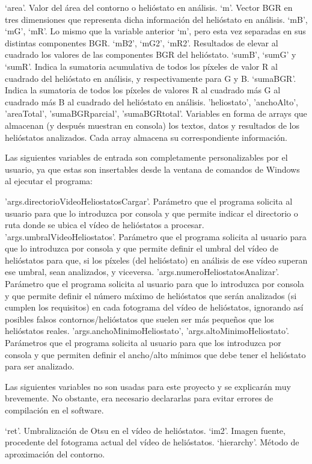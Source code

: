 \documentclass[12pt]{article}
\begin{document}
‘area’. Valor del área del contorno o helióstato en análisis.
‘m’. Vector BGR en tres dimensiones que representa dicha información del helióstato en análisis.
‘mB’, ‘mG’, ‘mR’. Lo mismo que la variable anterior ‘m’, pero esta vez separadas en sus distintas componentes BGR.
‘mB2’, ‘mG2’, ‘mR2’. Resultados de elevar al cuadrado los valores de las componentes BGR del helióstato.
‘sumB’, ‘sumG’ y ‘sumR’. Indica la sumatoria acumulativa de todos los píxeles de valor R al cuadrado del helióstato en análisis, y respectivamente para G y B.
‘sumaBGR’. Indica la sumatoria de todos los píxeles de valores R al cuadrado más G al cuadrado más B al cuadrado del helióstato en análisis.
'heliostato', 'anchoAlto', 'areaTotal', 'sumaBGRparcial', 'sumaBGRtotal'. Variables en forma de arrays que almacenan (y después muestran en consola) los textos, datos y resultados de los helióstatos analizados. Cada array almacena su correspondiente información.

Las siguientes variables de entrada son completamente personalizables por el usuario, ya que estas son insertables desde la ventana de comandos de Windows al ejecutar el programa:

'args.directorioVideoHeliostatosCargar'. Parámetro que el programa solicita al usuario para que lo introduzca por consola y que permite indicar el directorio o ruta donde se ubica el vídeo de helióstatos a procesar.
'args.umbralVideoHeliostatos'. Parámetro que el programa solicita al usuario para que lo introduzca por consola y que permite definir el umbral del vídeo de helióstatos para que, si los píxeles (del helióstato) en análisis de ese vídeo superan ese umbral, sean analizados, y viceversa.
'args.numeroHeliostatosAnalizar'. Parámetro que el programa solicita al usuario para que lo introduzca por consola y que permite definir el número máximo de helióstatos que serán analizados (si cumplen los requisitos) en cada fotograma del vídeo de helióstatos, ignorando así posibles falsos contornos/helióstatos que suelen ser más pequeños que los helióstatos reales.
'args.anchoMinimoHeliostato', 'args.altoMinimoHeliostato'. Parámetros que el programa solicita al usuario para que los introduzca por consola y que permiten definir el ancho/alto mínimos que debe tener el helióstato para ser analizado.

Las siguientes variables no son usadas para este proyecto y se explicarán muy brevemente. No obstante, era necesario declararlas para evitar errores de compilación en el software.

‘ret’. Umbralización de Otsu en el vídeo de helióstatos.
‘im2’. Imagen fuente, procedente del fotograma actual del vídeo de helióstatos.
‘hierarchy’. Método de aproximación del contorno.
\end{document}
